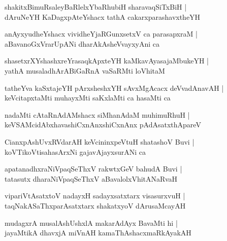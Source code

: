 \documentclass[twoside,12pt,openright]{book}
\newcounter{shloka}[chapter]
\begin{document}
\begin{shloka}%
shakitxBimuRsaleyBaRlelxYbaRhubiH sharavaqSiTxBiH |\\
dAruNeYH KaDagxpAteYshacx tathA cakarxparashavxtheYH 
\end{shloka}

\begin{shloka}%
anAyxyudheYshacx vividheYjaRGunxsetxV ca parasapxraM |\\
aBavanoGxVrarUpANi dharAkAsheVvayxyAni ca 
\end{shloka}

\begin{shloka}%
shasetxrXYshashxreYrasaqkApxteYH kaMkavAyasajaMbukeYH |\\
yathA musaladhArABiGaRnA vaSaRMti loVhitaM 
\end{shloka}

\begin{shloka}%
tatheYva kaSxtajeYH pArxsheshxYH sAvxMgAcacx deVvadAnavAH |\\
keVcitapxtaMti muhayxMti saKxlaMti ca hasaMti ca 
\end{shloka}

\begin{shloka}%
nadaMti cAtaRnAdAMshacx siMhanAdaM muhimuRhuH |\\
keVSAMcidAbxhavashiCxnAnxshiCxnAnx pAdAsatxthApareV 
\end{shloka}

\begin{shloka}%
CianxpAshUvxRVdarAH keVcininxpeVtuH shatashoV Buvi |\\
koVTikoVtisahasArxNi gajavAjayxsurANi ca 
\end{shloka}

\begin{shloka}%
apatanadhxraNiVpaqSeThxV rakwtxGeV bahudA Buvi |\\
tatasutx dharaNiVpaqSeThxV aBavalolxVhitANaRvaH 
\end{shloka}

\begin{shloka}%
vipariVtAsatxtoV nadayxH sadayxsatxtarx visasurxvuH |\\
taqNakASaThxparAsatxtarx shakatxyoV dArusaMcayAH 
\end{shloka}

\begin{shloka}%
mudagxrA musalAshUshxlA makarAdAyx BavaMti hi |\\
jayaMtikA dhavxjA miVnAH kamaThAshacxmaRkAyakAH 
\end{shloka}
\end{document}
